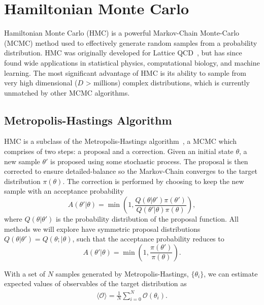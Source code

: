 \documentclass[11pt]{article}
\begin{document}
\section{Hamiltonian Monte Carlo}\label{sec:hamiltonian_monte_carlo}
    Hamiltonian Monte Carlo (HMC) is a powerful Markov-Chain Monte-Carlo (MCMC) method used to effectively generate
    random samples from a probability distribution.
    HMC was originally developed for Lattice QCD~\cite{HMC_Duane}, but has since found wide applications in statistical
    physics, computational biology, and machine learning.
    The most significant advantage of HMC is its ability to sample from very high dimensional ($D$ > millions)
    complex distributions, which is currently unmatched by other MCMC algorithms.

\subsection{Metropolis-Hastings Algorithm}\label{subsec:metropolis_hastings}
    HMC is a subclass of the Metropolis-Hastings algorithm~\cite{Metropolis_OG}, a MCMC which comprises of two
    steps: a proposal and a correction.
    Given an initial state $\theta$, a new sample $\theta'$ is proposed using some stochastic process.
    The proposal is then corrected to ensure detailed-balance so the Markov-Chain converges to the
    target distribution $\pi(\theta)$.
    The correction is performed by choosing to keep the new sample with an acceptance probability
    \begin{equation}\label{eq:metropolis_hastings}
        A(\theta' | \theta) = \min \left(1, \frac{Q(\theta | \theta') \pi(\theta') }{Q(\theta' | \theta) \pi(\theta) } \right),
    \end{equation}
    where $Q(\theta | \theta')$ is the probability distribution of the proposal function.
    All methods we will explore have symmetric proposal distributions $Q(\theta | \theta') = Q(\theta; | \theta)$,
    such that the acceptance probability reduces to
    \begin{equation}\label{eq:metropolis}
        A(\theta' | \theta) = \min \left(1, \frac{\pi(\theta') }{\pi(\theta) } \right).
    \end{equation}

    With a set of $N$ samples generated by Metropolis-Hastings, $\{ \theta_i \}$, we can estimate expected values of observables
    of the target distribution as
    \begin{equation}\label{eq:mcmc_observable}
    \begin{aligned}
        \langle \mathcal{O} \rangle = \frac{1}{N}\sum_{i=0}^N \mathcal{O}(\theta_i).
    \end{aligned}
    \end{equation}
\end{document}
